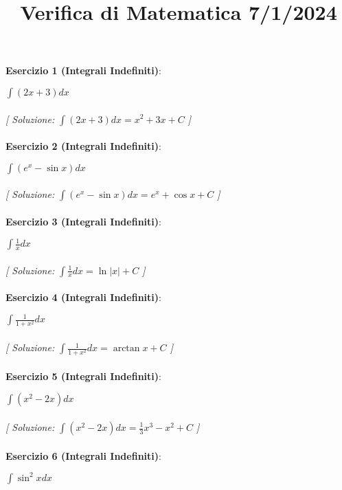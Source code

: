 \documentclass{article}
\title{\raggedright Verifica di Matematica  7/1/2024}
\date{}
\begin{document}
\maketitle

\textbf{Esercizio 1 (Integrali Indefiniti)}:\\
\par $\int (2x + 3)  dx$ \\\\

\textit{[ Soluzione: $\int (2x + 3)  dx = x^2 + 3x + C$ ]}\\\\

\textbf{Esercizio 2 (Integrali Indefiniti)}:\\
\par $\int (e^x - \sin x)  dx$ \\\\

\textit{[ Soluzione: $\int (e^x - \sin x)  dx = e^x + \cos x + C$ ]}\\\\

\textbf{Esercizio 3 (Integrali Indefiniti)}:\\
\par $\int \frac{1}{x}  dx$ \\\\

\textit{[ Soluzione: $\int \frac{1}{x}  dx = \ln |x| + C$ ]}\\\\

\textbf{Esercizio 4 (Integrali Indefiniti)}:\\
\par $\int \frac{1}{1 + x^2}  dx$ \\\\

\textit{[ Soluzione: $\int \frac{1}{1 + x^2}  dx = \arctan x + C$ ]}\\\\

\textbf{Esercizio 5 (Integrali Indefiniti)}:\\
\par $\int (x^2 - 2x)  dx$ \\\\

\textit{[ Soluzione: $\int (x^2 - 2x)  dx = \frac{1}{3}x^3 - x^2 + C$ ]}\\\\

\textbf{Esercizio 6 (Integrali Indefiniti)}:\\
\par $\int \sin^2 x  dx$ \\\\
\end{document}
